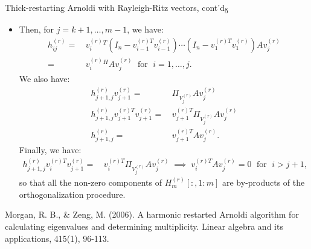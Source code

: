 \documentclass[t,usepdftitle=false]{beamer}
\begin{document}
\begin{frame}{Thick-restarting Arnoldi with Rayleigh-Ritz vectors, cont'd\textsubscript{5}}
\begin{itemize}
\item Then, for $j=k+1,\dots,m-1$, we have:
\begin{align*}
h_{ij}^{(r)}
=&\,
v_i^{(r)}{}^T\left(I_n-v_{i-1}^{(r)T}v_{i-1}^{(r)}\right)\cdots\left(I_n-v_{1}^{(r)T}v_{1}^{(r)}\right)Av_j^{(r)}\\
=&\,
v_i^{(r)}{}^HAv_j^{(r)}
\;\text{ for }\;
i=1,\dots,j.
\end{align*}
We also have:\vspace{-.6cm}
\begin{align*}
h_{j+1,j}^{(r)}v_{j+1}^{(r)}=&\,\Pi_{V_j^{(r)}}Av_j^{(r)}\\
h_{j+1,j}^{(r)}v_{j+1}^{(r)T}v_{j+1}^{(r)}=&\,v_{j+1}^{(r)T}\Pi_{V_j^{(r)}}Av_j^{(r)}\\
h_{j+1,j}^{(r)}=&\,v_{j+1}^{(r)T}Av_j^{(r)}.
\end{align*}
Finally, we have:
\begin{align*}
h_{j+1,j}^{(r)}v_{i}^{(r)T}v_{j+1}^{(r)}=&\,v_{i}^{(r)T}\Pi_{V_j^{(r)}}Av_j^{(r)}
\;\implies\;
v_{i}^{(r)T}Av_j^{(r)}=0
\;\text{ for }\;
i>j+1,
\end{align*}
so that all the non-zero components of $H_m^{(r)}[:,1\!:\!m]$ are by-products of the orthogonalization procedure.
\end{itemize}\smallskip
\tiny{Morgan, R. B., \& Zeng, M. (2006). A harmonic restarted Arnoldi algorithm for calculating eigenvalues and determining
multiplicity. Linear algebra and its applications, 415(1), 96-113.}
\end{frame}
\end{document}
